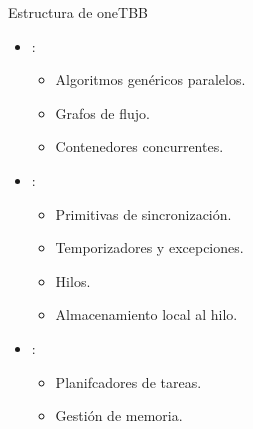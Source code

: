 \begin{frame}[t]{Estructura de oneTBB}
\begin{itemize}

  \item {}:
    \begin{itemize}
      \item Algoritmos genéricos paralelos.
      \item Grafos de flujo.
      \item Contenedores concurrentes.
    \end{itemize}

  \item {}:
    \begin{itemize}
      \item Primitivas de sincronización.
      \item Temporizadores y excepciones.
      \item Hilos.
      \item Almacenamiento local al hilo.
    \end{itemize}

  \item {}:
    \begin{itemize}
      \item Planifcadores de tareas.
      \item Gestión de memoria.
    \end{itemize}
\end{itemize}
\end{frame}


